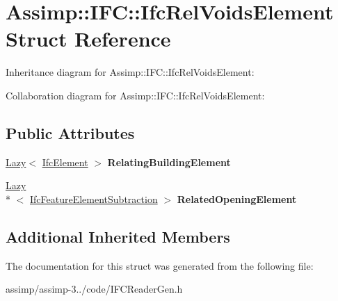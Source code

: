 \hypertarget{struct_assimp_1_1_i_f_c_1_1_ifc_rel_voids_element}{\section{Assimp\+:\+:I\+F\+C\+:\+:Ifc\+Rel\+Voids\+Element Struct Reference}
\label{struct_assimp_1_1_i_f_c_1_1_ifc_rel_voids_element}
}


Inheritance diagram for Assimp\+:\+:I\+F\+C\+:\+:Ifc\+Rel\+Voids\+Element\+:


Collaboration diagram for Assimp\+:\+:I\+F\+C\+:\+:Ifc\+Rel\+Voids\+Element\+:
\subsection*{Public Attributes}
\begin{DoxyCompactItemize}
\item 
\hypertarget{struct_assimp_1_1_i_f_c_1_1_ifc_rel_voids_element_aa3045e7d76d68392d0bb05a53ddef26d}{\hyperlink{struct_assimp_1_1_s_t_e_p_1_1_lazy}{Lazy}$<$ \hyperlink{struct_assimp_1_1_i_f_c_1_1_ifc_element}{Ifc\+Element} $>$ {\bfseries Relating\+Building\+Element}}\label{struct_assimp_1_1_i_f_c_1_1_ifc_rel_voids_element_aa3045e7d76d68392d0bb05a53ddef26d}

\item 
\hypertarget{struct_assimp_1_1_i_f_c_1_1_ifc_rel_voids_element_ade9a6cf1a42f68deb530c7becd1ea18e}{\hyperlink{struct_assimp_1_1_s_t_e_p_1_1_lazy}{Lazy}\\*
$<$ \hyperlink{struct_assimp_1_1_i_f_c_1_1_ifc_feature_element_subtraction}{Ifc\+Feature\+Element\+Subtraction} $>$ {\bfseries Related\+Opening\+Element}}\label{struct_assimp_1_1_i_f_c_1_1_ifc_rel_voids_element_ade9a6cf1a42f68deb530c7becd1ea18e}

\end{DoxyCompactItemize}
\subsection*{Additional Inherited Members}


The documentation for this struct was generated from the following file\+:\begin{DoxyCompactItemize}
\item 
assimp/assimp-\/3../code/I\+F\+C\+Reader\+Gen.\+h\end{DoxyCompactItemize}
